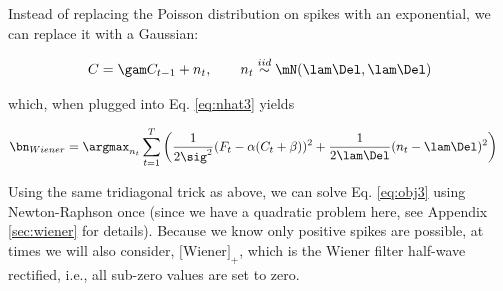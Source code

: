 Instead of replacing the Poisson distribution on spikes with an exponential, we can replace it with a Gaussian:

 \begin{align} \label{eq:C3}
	C = \gam C_{t-1} + n_t, \qquad n_t \overset{iid}{\sim} \mN(\lam \Del, \lam \Del)
\end{align}

\noindent which, when plugged into Eq. \eqref{eq:nhat3} yields

\begin{align} \label{eq:obj3}
\bn_{Wiener} &= \argmax_{n_t}  \sum_{t=1}^T \bigg( \frac{1}{2 \sig^2}(F_t - \alpha(C_t + \beta))^2  + 
 \frac{1}{2 \lam \Del}(n_t - \lam \Del)^2\bigg) 
\end{align}

Using the same tridiagonal trick as above, we can solve Eq. \eqref{eq:obj3} using Newton-Raphson once (since we have a quadratic problem here, see Appendix \ref{sec:wiener} for details).  Because we know only positive spikes are possible, at times we will also consider, $[$Wiener$]_+$, which is the Wiener filter half-wave rectified, i.e., all sub-zero values are set to zero.  